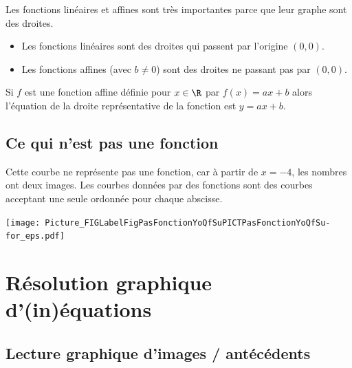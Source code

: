 \begin{Aretenir}
    Les fonctions linéaires et affines sont très importantes parce que leur graphe sont des droites. 
    \begin{itemize}
        \item 
    Les fonctions linéaires sont des droites qui passent par l'origine \( (0,0)\).
    \item
    Les fonctions affines (avec \( b\neq 0\)) sont des droites ne passant pas par \( (0,0)\).
    \end{itemize}
\end{Aretenir}
Si $f$ est une fonction affine définie pour $x\in\R$ par $f(x)=ax+b$ alors l'équation de la droite représentative de la fonction est $y=ax+b$. 

\subsection{Ce qui n'est pas une fonction}


\begin{multicols}{2}
    Cette courbe ne représente pas une fonction, car à partir de \( x=-4\), les nombres ont deux images. Les courbes données par des fonctions sont des courbes acceptant une seule ordonnée pour chaque abscisse.

\columnbreak

\texttt{[image: Picture\_FIGLabelFigPasFonctionYoQfSuPICTPasFonctionYoQfSu-for\_eps.pdf]}

\end{multicols}

\section{Résolution graphique d'(in)équations} 

\subsection{Lecture graphique d'images / antécédents}




